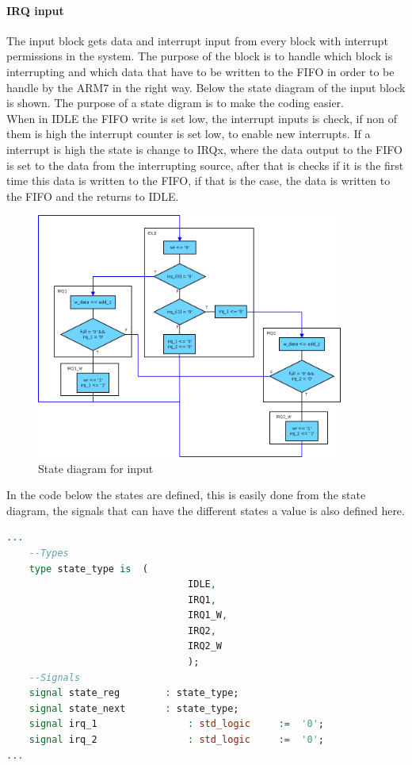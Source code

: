 \paragraph{IRQ input}
The input block gets data and interrupt input from every block with interrupt permissions in the system. The purpose of the block is to handle which block is interrupting and which data that have to be written to the FIFO in order to be handle by the ARM7 in the right way. Below the state diagram of the input block is shown. The purpose of a state digram is to make the coding easier.\\
When in IDLE the FIFO write is set low, the interrupt inputs is check, if non of them is high the interrupt counter is set low, to enable new interrupts. If a interrupt is high the state is change to IRQx, where the data output to the FIFO is set to the data from the interrupting source, after that is checks if it is the first time this data is written to the FIFO, if that is the case, the data is written to the FIFO and the returns to IDLE. 
\begin{figure}[H]
	\begin{centering}
		\includegraphics[width=0.9\textwidth]{images/tb5_irq_input_state.png}
		\caption{State diagram for input}
	\end{centering}
\end{figure}
In the code below the states are defined, this is easily done from the state diagram, the signals that can have the different states a value is also defined here.
\begin{lstlisting}[language=VHDL]
...
	--Types
	type state_type is	(
								IDLE,
								IRQ1,
								IRQ1_W,
								IRQ2,
								IRQ2_W
								);
	--Signals
	signal state_reg		: state_type;
	signal state_next		: state_type;
	signal irq_1				: std_logic		:=	'0';
	signal irq_2				: std_logic		:=	'0';
...
\end{lstlisting}
